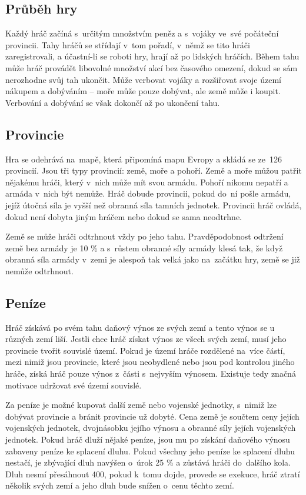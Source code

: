 \documentclass[a4paper,12pt]{article}
\begin{document}
\subsection{Průběh hry}
Každý hráč začíná s~určitým množstvím peněz a s~vojáky ve~své počáteční provincii. Tahy hráčů se střídají v~tom pořadí, v~němž se tito hráči zaregistrovali, a účastní-li se roboti hry, hrají až po lidských hráčích. Během tahu může hráč provádět libovolné množství akcí bez časového omezení, dokud se sám nerozhodne svůj tah ukončit. Může verbovat vojáky a rozšiřovat svoje území nákupem a dobýváním -- moře může pouze dobývat, ale země může i koupit. Verbování a dobývání se však dokončí až po ukončení tahu.
\subsection{Provincie}
Hra se odehrává na~mapě, která připomíná mapu Evropy a skládá se ze~126 provincií. Jsou tři typy provincií: země, moře a pohoří. Země a moře můžou patřit nějakému hráči, který v~nich může mít svou armádu. Pohoří nikomu nepatří a armáda v~nich být nemůže. Hráč dobude provincii, pokud do~ní pošle armádu, jejíž útočná síla je vyšší než obranná síla tamních jednotek. Provincii hráč ovládá, dokud není dobyta jiným hráčem nebo dokud se sama neodtrhne.

Země se může hráči odtrhnout vždy po jeho tahu. Pravděpodobnost odtržení země bez armády je 10 \% a s~růstem obranné síly armády klesá tak, že když obranná síla armády v~zemi je alespoň tak velká jako na~začátku hry, země se již nemůže odtrhnout.
\subsection{Peníze}
Hráč získává po svém tahu daňový výnos ze svých zemí a tento výnos se u různých zemí liší. Jestli chce hráč získat výnos ze všech svých zemí, musí jeho provincie tvořit souvislé území. Pokud je území hráče rozdělené na~více částí, mezi nimiž jsou provincie, které jsou neobydlené nebo jsou pod kontrolou jiného hráče, získá hráč pouze výnos z~části s~nejvyším výnosem. Existuje tedy značná motivace udržovat své území souvislé.

Za peníze je možné kupovat další země nebo vojenské jednotky, s~nimiž lze dobývat provincie a bránit provincie už dobyté. Cena země je součtem ceny jejích vojenských jednotek, dvojnásobku jejího výnosu a obranné síly jejích vojenských jednotek. Pokud hráč dluží nějaké peníze, jsou mu po získání daňového výnosu zabaveny peníze ke splacení dluhu. Pokud všechny jeho peníze ke splacení dluhu nestačí, je zbývající dluh navýšen o~úrok 25 \% a zůstává hráči do~dalšího kola. Dluh nesmí přesáhnout 400, pokud k~tomu dojde, provede se exekuce, hráč ztratí několik svých zemí a jeho dluh bude snížen o~cenu těchto zemí.
\end{document}
